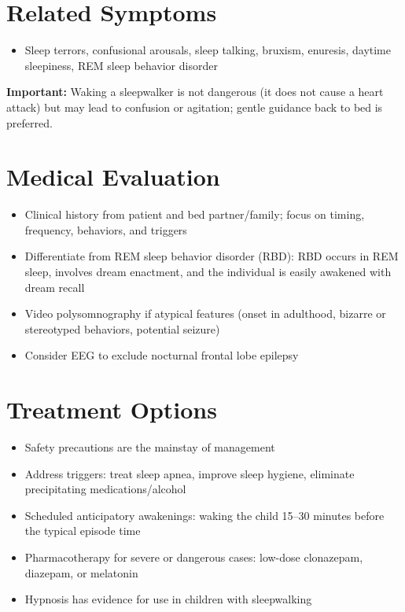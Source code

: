 \section*{Related Symptoms}
\begin{itemize}
  \item Sleep terrors, confusional arousals, sleep talking, bruxism, enuresis, daytime sleepiness, REM sleep behavior disorder
\end{itemize}
\textbf{Important:} Waking a sleepwalker is not dangerous (it does not cause a heart attack) but may lead to confusion or agitation; gentle guidance back to bed is preferred.

\section*{Medical Evaluation}
\begin{itemize}
  \item Clinical history from patient and bed partner/family; focus on timing, frequency, behaviors, and triggers
  \item Differentiate from REM sleep behavior disorder (RBD): RBD occurs in REM sleep, involves dream enactment, and the individual is easily awakened with dream recall
  \item Video polysomnography if atypical features (onset in adulthood, bizarre or stereotyped behaviors, potential seizure)
  \item Consider EEG to exclude nocturnal frontal lobe epilepsy
\end{itemize}

\section*{Treatment Options}
\begin{itemize}
  \item Safety precautions are the mainstay of management
  \item Address triggers: treat sleep apnea, improve sleep hygiene, eliminate precipitating medications/alcohol
  \item Scheduled anticipatory awakenings: waking the child 15--30 minutes before the typical episode time
  \item Pharmacotherapy for severe or dangerous cases: low-dose clonazepam, diazepam, or melatonin
  \item Hypnosis has evidence for use in children with sleepwalking
\end{itemize}

